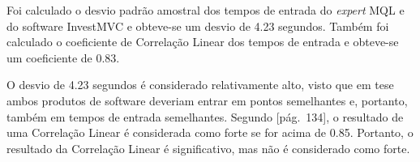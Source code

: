 Foi calculado o desvio padrão amostral dos tempos de entrada do \textit{expert} MQL e do software InvestMVC e obteve-se um desvio de 4.23 segundos. Também foi calculado o coeficiente  de Correlação Linear dos tempos de entrada e obteve-se um coeficiente de 0.83.

O desvio de 4.23 segundos é considerado relativamente alto, visto que em tese ambos produtos de software deveriam entrar em pontos semelhantes e, portanto, também em tempos de entrada semelhantes. Segundo [pág.~134], o resultado de uma Correlação Linear é considerada como forte se for acima de 0.85. Portanto, o resultado da Correlação Linear é significativo, mas não é considerado como forte. 
